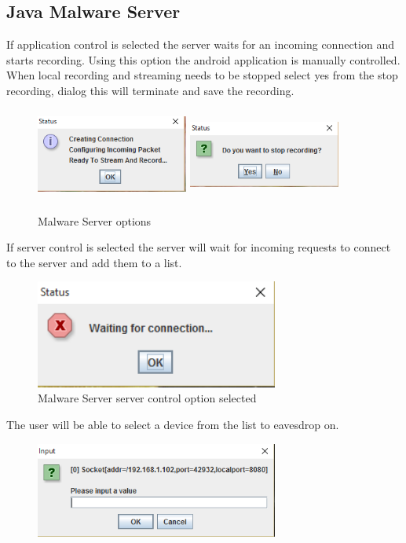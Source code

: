 \documentclass[a4paper,12pt,titlepage]{article}
\begin{document}
\subsection{Java Malware Server}
\begin{enumerate}
\item{If application control is selected the server waits for an incoming connection and starts recording. Using this option the android application is manually controlled. When local recording and streaming needs to be stopped select yes from the stop recording, dialog this will terminate and save the recording.
\begin{figure}[H]
\center
\includegraphics[width=5cm,height=3cm]{MalwareScreenshots/infoStatus}
\includegraphics[width=5cm,height=3cm]{MalwareScreenshots/stopRec}
\caption{Malware Server options}
\label{fig:my_label7}
\end{figure}}
\item{If server control is selected the server will wait for incoming requests to connect to the server and add them to a list. 
\begin{figure}[H]
\center
\includegraphics[width=8cm]{MalwareScreenshots/waiting}
\caption{Malware Server server control option selected}
\label{fig:my_label8}
\end{figure}
\item The user will be able to select a device from the list to eavesdrop on.
\begin{figure}[H]
\center
\includegraphics[width=8cm]{MalwareScreenshots/select}

\end{figure}}
\end{enumerate}
\end{document}
